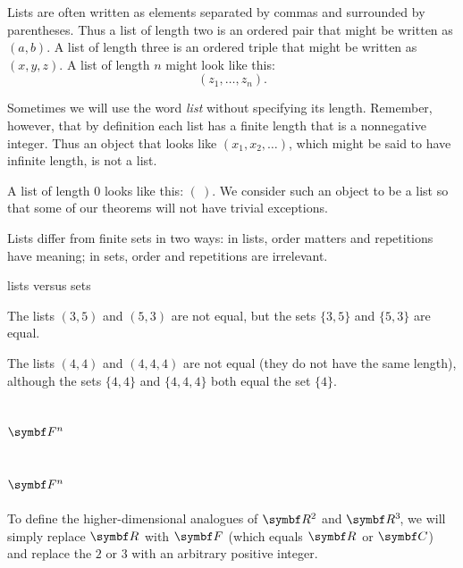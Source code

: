 
Lists are often written as elements separated by commas and surrounded by parentheses. Thus a list of length two is an ordered pair that might be written as $(a, b)$. A list of length three is an ordered triple that might be written as $(x,y,z)$. A list of length $n$ might look like this:
\[
(z_1, \dots, z_n).
\]

Sometimes we will use the word \emph{list} without specifying its length. Remember, however, that by definition each list has a finite length that is a nonnegative integer. Thus an object that looks like
$
(x_1, x_2, \dotsc )$,
which might be said to have infinite length, is not a list.

A list of length $0$ looks like this: $(\ )$.  We consider such an object to be
a list so that some of our theorems will not have trivial exceptions.

Lists differ from finite sets in two ways: in lists, order matters and  repetitions
have meaning; in sets, order and repetitions are irrelevant.

\begin{example}{lists versus sets}
\begin{Itemize}
\item
The lists $(3,5)$ and $(5,3)$ are not equal, but the sets $\{3,5\}$ and
$\{5,3\}$ are equal.
\item
The lists $(4,4)$ and $(4, 4, 4)$ are not equal
(they do not
have the same length), although the sets $\{4,4\}$ and $\{4, 4, 4\}$ both
equal the set $\{4\}$.
\end{Itemize}
\exampleitemend
\vspace{2bp}
\end{example}

\ifnum{}
    \subsection{\texorpdfstring{$\F n$}{Fn}} %
    \else
    \subsection{$\F n$}
    \fi

To define the higher-dimensional analogues of $\R{2}$ and $\RR{3}$, we
will simply replace $\R{}$ with $\F{}$ (which equals $\R{}$ or $\C{}$) and replace the $2$ or
$3$ with an arbitrary positive integer.

